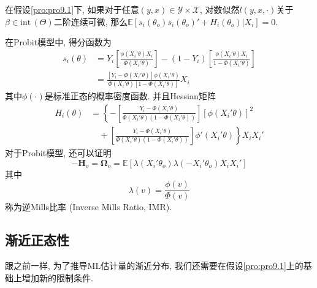 \documentclass[cn, 12pt, math=mtpro2, bibstyle=apa, blue, twocol]{elegantbook}
\newcommand{\E}{\mathbb{E}}
\newcommand{\BO}{\mathbold{\Omega}}
\begin{document}
\begin{theorem}\label{thm:thm9.2}
  在假设\ref{pro:pro9.1}下, 如果对于任意$(y,x)\in\mathscr{Y}\times \mathscr{X}$, 对数似然$l(y,x,\cdot)$关于$\beta\in\text{int}\,(\Theta)$二阶连续可微, 那么$\E[s_i(\theta_o)s_i(\theta_o)'+H_i(\theta_o)|X_i]=0$.
\end{theorem}
在Probit模型中, 得分函数为
\begin{align*}
s_i(\theta)&=Y_i\left[\frac{\phi(X_i'\theta)X_i}{\Phi(X_i'\theta)}\right]-(1-Y_i)\left[\frac{\phi(X_i'\theta)X_i}{1-\Phi(X_i'\theta)}\right] \\
&=\frac{[Y_i-\Phi(X_i'\theta)]\phi(X_i'\theta)}{\Phi(X_i'\theta)[1-\Phi(X_i'\theta)]}X_i
\end{align*}
其中$\phi(\cdot)$是标准正态的概率密度函数. 并且Hessian矩阵
\begin{align*}
H_i(\theta)&=\left\{-\left[\frac{Y_i-\Phi(X_i'\theta)}{\Phi(X_i'\theta)(1-\Phi(X_i'\theta))}\right][\phi(X_i'\theta)]^2\right.\\
&\quad +\left.\left[\frac{Y_i-\Phi(X_i'\theta)}{\Phi(X_i'\theta)(1-\Phi(X_i'\theta))}\right]\phi'(X_i'\theta)\right\}X_iX_i'
\end{align*}
对于Probit模型, 还可以证明
$$-\mathbold{H}_o=\BO_o=\E[\lambda(X_i'\theta_o)\lambda(-X_i'\theta_o)X_iX_i']$$
其中$$\lambda(v)=\frac{\phi(v)}{\Phi(v)}$$称为逆Mills比率 (Inverse Mills Ratio, IMR).
\subsection{渐近正态性}
跟之前一样, 为了推导ML估计量的渐近分布, 我们还需要在假设\ref{pro:pro9.1}上的基础上增加新的限制条件.
\end{document}
